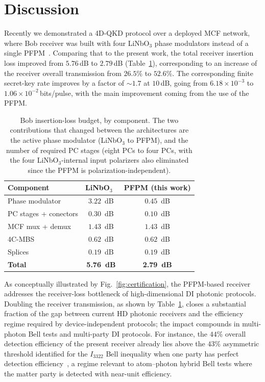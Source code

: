 \documentclass[pra,aps,reprint,nofootinbib,superscriptaddress,floatfix]{revtex4-2}
\begin{document}
\section*{Discussion}
\label{sec:discussion}

Recently we demonstrated a 4D-QKD protocol over a deployed MCF network, where Bob receiver was built with four LiNbO$_3$ phase modulators instead of a single PFPM~\cite{dosSantos2026}. Comparing that to the present work, the total receiver insertion loss improved from $5.76\,$dB to $2.79\,$dB (Table~\ref{tab:bob-budget}), corresponding to an increase of the receiver overall transmission from $26.5\%$ to $52.6\%$. The corresponding finite secret-key rate improves by a factor of $\sim 1.7$ at $10\,$dB, going from $6.18\times 10^{-3}$ to $1.06\times 10^{-2}\,$bits/pulse, with the main improvement coming from the use of the PFPM.

\begin{table}[t]
\caption{Bob insertion-loss budget, by component. The two contributions that changed between the architectures are the active phase modulator (LiNbO$_3$ to PFPM), and the number of required PC stages (eight PCs to four PCs, with the four LiNbO$_3$-internal input polarizers also eliminated since the PFPM is polarization-independent).}
\centering
\begin{tabular}{lcc}
\toprule
Component & LiNbO$_3$~\cite{dosSantos2026} & PFPM (this work) \\
\midrule
Phase modulator      & $3.22$~dB  & $0.45$~dB \\
PC stages + conectors      & $0.30$~dB  & $0.10$~dB  \\
MCF mux + demux      & $1.43$~dB  & $1.43$~dB  \\
4C-MBS      & $0.62$~dB  & $0.62$~dB  \\
Splices   & $0.19$~dB  & $0.19$~dB \\
\midrule
\textbf{Total}       & \textbf{5.76~dB} & \textbf{2.79~dB} \\
\bottomrule
\end{tabular}
\label{tab:bob-budget}
\end{table}

As conceptually illustrated by Fig.~\ref{fig:certification}, the PFPM-based receiver addresses the receiver-loss bottleneck of high-dimensional DI photonic protocols. Doubling the receiver transmission, as shown by Table~\ref{tab:bob-budget}, closes a substantial fraction of the gap between current HD photonic receivers and the efficiency regime required by device-independent protocols; the impact compounds in multi-photon Bell tests and multi-party DI protocols. For instance, the $44\%$ overall detection efficiency of the present receiver already lies above the $43\%$ asymmetric threshold identified for the $I_{3322}$ Bell inequality when one party has perfect detection efficiency~\cite{Brunner2007AsymmetricBell}, a regime relevant to atom--photon hybrid Bell tests where the matter party is detected with near-unit efficiency. 
\end{document}
